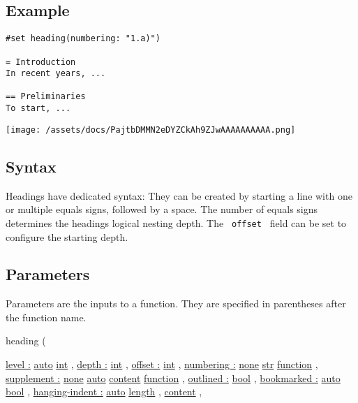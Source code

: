 \subsection{Example}\label{example}

\begin{verbatim}
#set heading(numbering: "1.a)")

= Introduction
In recent years, ...

== Preliminaries
To start, ...
\end{verbatim}

\texttt{[image: /assets/docs/PajtbDMMN2eDYZCkAh9ZJwAAAAAAAAAA.png]}

\subsection{Syntax}\label{syntax}

Headings have dedicated syntax: They can be created by starting a line
with one or multiple equals signs, followed by a space. The number of
equals signs determines the heading\textquotesingle s logical nesting
depth. The \texttt{\ offset\ } field can be set to configure the
starting depth.

\subsection{\texorpdfstring{{ Parameters
}}{ Parameters }}\label{parameters}

\label{parameters-tooltip}
Parameters are the inputs to a function. They are specified in
parentheses after the function name.

{ heading } (

{ \hyperref[parameters-level]{level :}
\href{/docs/reference/foundations/auto/}{auto}
\href{/docs/reference/foundations/int/}{int} , } {
\hyperref[parameters-depth]{depth :}
\href{/docs/reference/foundations/int/}{int} , } {
\hyperref[parameters-offset]{offset :}
\href{/docs/reference/foundations/int/}{int} , } {
\hyperref[parameters-numbering]{numbering :}
\href{/docs/reference/foundations/none/}{none}
\href{/docs/reference/foundations/str/}{str}
\href{/docs/reference/foundations/function/}{function} , } {
\hyperref[parameters-supplement]{supplement :}
\href{/docs/reference/foundations/none/}{none}
\href{/docs/reference/foundations/auto/}{auto}
\href{/docs/reference/foundations/content/}{content}
\href{/docs/reference/foundations/function/}{function} , } {
\hyperref[parameters-outlined]{outlined :}
\href{/docs/reference/foundations/bool/}{bool} , } {
\hyperref[parameters-bookmarked]{bookmarked :}
\href{/docs/reference/foundations/auto/}{auto}
\href{/docs/reference/foundations/bool/}{bool} , } {
\hyperref[parameters-hanging-indent]{hanging-indent :}
\href{/docs/reference/foundations/auto/}{auto}
\href{/docs/reference/layout/length/}{length} , } {
\href{/docs/reference/foundations/content/}{content} , }

